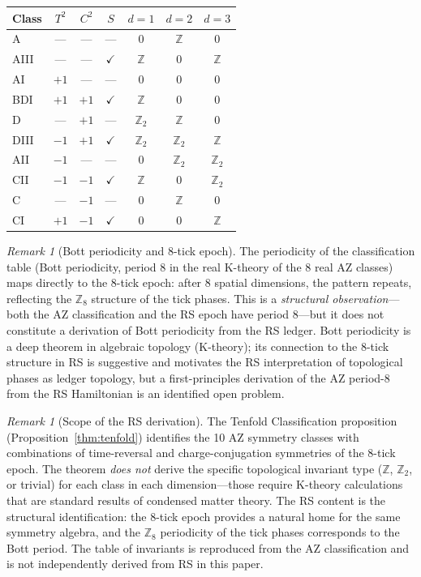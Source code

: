\documentclass[12pt,a4paper]{article}
\theoremstyle{definition}
\theoremstyle{remark}
\newtheorem{remark}[theorem]{Remark}
\begin{document}
\begin{center}
\renewcommand{\arraystretch}{1.2}
\begin{tabular}{@{}lcccccc@{}}
\toprule
\textbf{Class} & $T^2$ & $C^2$ & $S$ & $d=1$ & $d=2$ & $d=3$ \\
\midrule
A   & --- & --- & --- & $0$ & $\mathbb{Z}$ & $0$ \\
AIII & --- & --- & $\checkmark$ & $\mathbb{Z}$ & $0$ & $\mathbb{Z}$ \\
AI  & $+1$ & --- & --- & $0$ & $0$ & $0$ \\
BDI & $+1$ & $+1$ & $\checkmark$ & $\mathbb{Z}$ & $0$ & $0$ \\
D   & --- & $+1$ & --- & $\mathbb{Z}_2$ & $\mathbb{Z}$ & $0$ \\
DIII & $-1$ & $+1$ & $\checkmark$ & $\mathbb{Z}_2$ & $\mathbb{Z}_2$ & $\mathbb{Z}$ \\
AII & $-1$ & --- & --- & $0$ & $\mathbb{Z}_2$ & $\mathbb{Z}_2$ \\
CII & $-1$ & $-1$ & $\checkmark$ & $\mathbb{Z}$ & $0$ & $\mathbb{Z}_2$ \\
C   & --- & $-1$ & --- & $0$ & $\mathbb{Z}$ & $0$ \\
CI  & $+1$ & $-1$ & $\checkmark$ & $0$ & $0$ & $\mathbb{Z}$ \\
\bottomrule
\end{tabular}
\end{center}

\begin{remark}[Bott periodicity and 8-tick epoch]
The periodicity of the classification table (Bott periodicity,
period 8 in the real K-theory of the 8 real AZ classes) maps
directly to the 8-tick epoch: after 8 spatial dimensions, the
pattern repeats, reflecting the $\mathbb{Z}_8$ structure of the
tick phases.  This is a \emph{structural observation}---both the
AZ classification and the RS epoch have period 8---but it does not
constitute a derivation of Bott periodicity from the RS ledger.
Bott periodicity is a deep theorem in algebraic topology (K-theory);
its connection to the 8-tick structure in RS is suggestive and
motivates the RS interpretation of topological phases as ledger
topology, but a first-principles derivation of the AZ period-8
from the RS Hamiltonian is an identified open problem.
\end{remark}

\begin{remark}[Scope of the RS derivation]
\label{rem:topo-scope}
The Tenfold Classification proposition (Proposition~\ref{thm:tenfold})
identifies the 10 AZ symmetry classes with combinations of
time-reversal and charge-conjugation symmetries of the 8-tick
epoch.  The theorem \emph{does not} derive the specific topological
invariant type ($\mathbb{Z}$, $\mathbb{Z}_2$, or trivial) for each
class in each dimension---those require K-theory calculations that
are standard results of condensed matter theory.  The RS content is
the structural identification: the 8-tick epoch provides a natural
home for the same symmetry algebra, and the $\mathbb{Z}_8$
periodicity of the tick phases corresponds to the Bott period.
The table of invariants is reproduced from the AZ classification
and is not independently derived from RS in this paper.
\end{remark}
\end{document}
